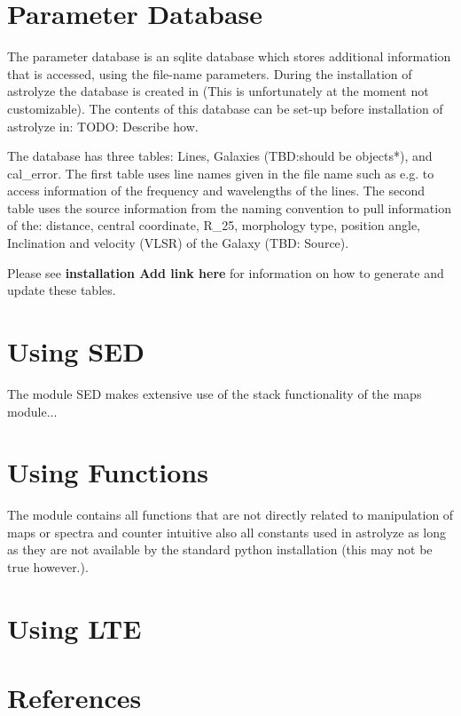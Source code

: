 \documentclass[a4paper,10pt,english]{sphinxmanual}
\begin{document}
\section{Parameter Database}
\label{manual:parameter-database}
The parameter database is an sqlite database which stores additional
information that is accessed, using the file-name parameters.  During the
installation of astrolyze the database is created in 
(This is unfortunately at the moment not customizable). The contents of this
database can be set-up before installation of astrolyze in: TODO: Describe how.

The database  has three tables: Lines, Galaxies (TBD:should be
objects*), and cal\_error. The first table uses line names given in the file
name such as e.g.  to access information of the frequency and
wavelengths of the lines. The second table  uses the source
information from the naming convention to pull information of the:
distance, central coordinate, R\_25, morphology type, position angle,
Inclination and velocity (VLSR) of the Galaxy (TBD: Source).

Please see \textbf{installation Add link here} for information on how to generate
and update these tables.


\section{Using SED}
\label{manual:using-sed}
The module SED makes extensive use of the stack functionality of the maps
module...


\section{Using Functions}
\label{manual:using-functions}
The module  contains all functions that are not directly related
to manipulation of maps or spectra and counter intuitive also all constants used
in astrolyze as long as they are not available by the standard python
installation (this may not be true however.).


\section{Using LTE}
\label{manual:using-lte}

\section{References}
\label{manual:references}
\end{document}
